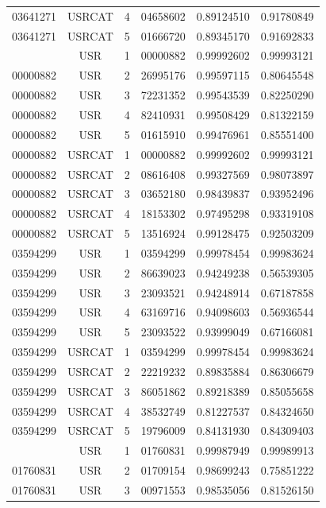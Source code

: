\begin{longtable}{cccccc}
03641271 & USRCAT & 4 & 04658602 & 0.89124510 & 0.91780849\\
03641271 & USRCAT & 5 & 01666720 & 0.89345170 & 0.91692833\\
\hline
\pagebreak
00000882 & USR    & 1 & 00000882 & 0.99992602 & 0.99993121\\%
00000882 & USR    & 2 & 26995176 & 0.99597115 & 0.80645548\\
00000882 & USR    & 3 & 72231352 & 0.99543539 & 0.82250290\\
00000882 & USR    & 4 & 82410931 & 0.99508429 & 0.81322159\\
00000882 & USR    & 5 & 01615910 & 0.99476961 & 0.85551400\\
00000882 & USRCAT & 1 & 00000882 & 0.99992602 & 0.99993121\\%
00000882 & USRCAT & 2 & 08616408 & 0.99327569 & 0.98073897\\
00000882 & USRCAT & 3 & 03652180 & 0.98439837 & 0.93952496\\
00000882 & USRCAT & 4 & 18153302 & 0.97495298 & 0.93319108\\
00000882 & USRCAT & 5 & 13516924 & 0.99128475 & 0.92503209\\
\hline
03594299 & USR    & 1 & 03594299 & 0.99978454 & 0.99983624\\%
03594299 & USR    & 2 & 86639023 & 0.94249238 & 0.56539305\\
03594299 & USR    & 3 & 23093521 & 0.94248914 & 0.67187858\\
03594299 & USR    & 4 & 63169716 & 0.94098603 & 0.56936544\\
03594299 & USR    & 5 & 23093522 & 0.93999049 & 0.67166081\\
03594299 & USRCAT & 1 & 03594299 & 0.99978454 & 0.99983624\\%
03594299 & USRCAT & 2 & 22219232 & 0.89835884 & 0.86306679\\
03594299 & USRCAT & 3 & 86051862 & 0.89218389 & 0.85055658\\
03594299 & USRCAT & 4 & 38532749 & 0.81227537 & 0.84324650\\
03594299 & USRCAT & 5 & 19796009 & 0.84131930 & 0.84309403\\
\hline
\pagebreak
01760831 & USR    & 1 & 01760831 & 0.99987949 & 0.99989913\\%
01760831 & USR    & 2 & 01709154 & 0.98699243 & 0.75851222\\
01760831 & USR    & 3 & 00971553 & 0.98535056 & 0.81526150\\

\end{longtable}
